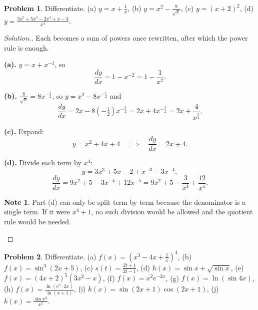 \documentclass[11pt,a4paper]{article}
\theoremstyle{definition}
\newtheorem{note}[thm]{Note}
\newtheorem{problemx}{Problem}[section]
\newenvironment{problem}{\begin{problemx}}{\end{problemx}}
\newenvironment{solution}
  {\renewcommand{\qedsymbol}{}\begin{proof}[\textit{Solution}.]}
  {\end{proof}}
\begin{document}
\begin{problem}
Differentiate.
\quad (a) $y=x+\frac{1}{x}$, \quad (b) $y=x^2-\frac{8}{\sqrt{x}}$, \quad
(c) $y=(x+2)^2$, \quad (d) $y=\frac{3x^7+5x^5-2x^4+x-3}{x^4}$.
\end{problem}

\begin{solution}
Each becomes a sum of powers once rewritten, after which the power rule is enough.

\textbf{(a).} $y=x+x^{-1}$, so
$$\frac{dy}{dx}=1-x^{-2}=1-\frac{1}{x^2}.$$

\textbf{(b).} $\frac{8}{\sqrt{x}}=8x^{-\frac{1}{2}}$, so $y=x^2-8x^{-\frac{1}{2}}$ and
$$\frac{dy}{dx}=2x-8\left(-\tfrac{1}{2}\right)x^{-\frac{3}{2}}
=2x+4x^{-\frac{3}{2}}=2x+\frac{4}{x^{\frac{3}{2}}}.$$

\textbf{(c).} Expand:
$$y=x^2+4x+4\quad\implies\quad \frac{dy}{dx}=2x+4.$$

\textbf{(d).} Divide each term by $x^4$:
$$y=3x^3+5x-2+x^{-3}-3x^{-4},$$
$$\frac{dy}{dx}=9x^2+5-3x^{-4}+12x^{-5}=9x^2+5-\frac{3}{x^4}+\frac{12}{x^5}.$$

\begin{note}
Part (d) can only be split term by term because the denominator is a single term. If it
were $x^4+1$, no such division would be allowed and the quotient rule would be needed.
\end{note}
\end{solution}

\begin{problem}
Differentiate.
\quad (a) $f(x)=\left(x^3-4x+\frac{1}{x}\right)^4$, \quad (b) $f(x)=\sin^3(2x+5)$,
\quad (c) $s(t)=\frac{2t+1}{2t-1}$, \quad (d) $h(x)=\sin x+\sqrt{\sin x}$, \quad
(e) $f(x)=(4x+2)^5\left(3x^2-x\right)$, \quad (f) $f(x)=x^2e^{-2x}$, \quad
(g) $f(x)=\ln(\sin 4x)$, \quad (h) $f(x)=\frac{\ln\left(e^x\cdot 2x\right)}{\ln(x+1)}$,
\quad (i) $h(x)=\sin(2x+1)\cos(2x+1)$, \quad (j) $k(x)=\frac{\sin x^2}{x^2}$.
\end{problem}
\end{document}
